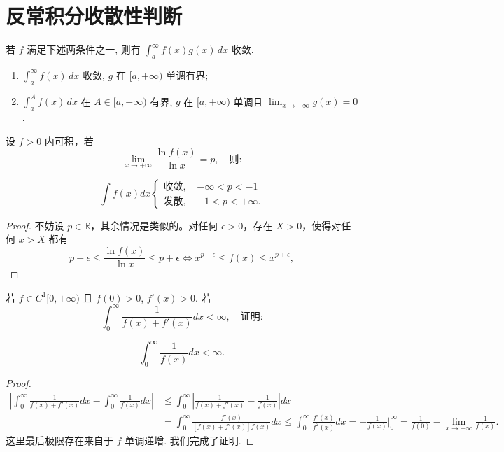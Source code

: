 \documentclass[lang=cn,10pt,thmcnt=section]{elegantbook}
\begin{document}
\section{反常积分收散性判断}
\begin{theorem}[A-D判别法]
	若 \( f \) 满足下述两条件之一, 则有 $\displaystyle\int_a^\infty f(x)g(x) \, dx$ 收敛.

\begin{enumerate}[label=\arabic*., wide, labelindent=0pt]
    \item $\displaystyle\int_a^\infty f(x) \, dx$ 收敛, \( g \) 在 \( [a, +\infty) \) 单调有界;
    \item $\displaystyle\int_a^A f(x) \, dx$ 在 \( A \in [a, +\infty) \) 有界, \( g \) 在 \( [a, +\infty) \) 单调且 $\displaystyle\lim_{x\to+\infty} g(x) = 0$.
\end{enumerate}
\end{theorem}
\begin{example}
	设 \( f > 0 \) 内可积，若  
\[
\lim_{x \to +\infty} \frac{\ln f(x)}{\ln x} = p, \quad \text{则:}
\]

\[
\int f(x) dx 
\begin{cases} 
\text{收敛, } & -\infty < p < -1 \\ 
\text{发散, } & -1 < p < +\infty.
\end{cases}
\]
\end{example}
\begin{proof}
	不妨设 $p \in \mathbb{R}$，其余情况是类似的。对任何 $\epsilon > 0$，存在 $X > 0$，使得对任何 $x > X$ 都有
\[
p - \epsilon \le \frac{\ln f(x)}{\ln x} \le p + \epsilon \iff x^{p-\epsilon} \le f(x) \le x^{p+\epsilon},
\]

\end{proof}
\begin{example}
	若 \( f \in C^1[0,+\infty) \) 且 \( f(0) > 0 \), \( f'(x) > 0 \). 若  
\[
\int_0^\infty \frac{1}{f(x)+f'(x)} dx < \infty, \quad \text{证明:}
\]

\[
\int_0^\infty \frac{1}{f(x)} dx < \infty.
\]
\end{example}
\begin{proof}
	\begin{align*}
		\left| \int_0^\infty \frac{1}{f(x) + f'(x)} dx - \int_0^\infty \frac{1}{f(x)} dx \right| &\le \int_0^\infty \left| \frac{1}{f(x) + f'(x)} - \frac{1}{f(x)} \right| dx \\
		&= \int_0^\infty \frac{f'(x)}{[f(x) + f'(x)] f(x)} dx \le \int_0^\infty \frac{f'(x)}{f^2(x)} dx = -\frac{1}{f(x)} \bigg|_0^\infty = \frac{1}{f(0)} - \lim_{x\to+\infty} \frac{1}{f(x)}.
	\end{align*}
	这里最后极限存在来自于 $f$ 单调递增. 我们完成了证明.
\end{proof}
\end{document}
